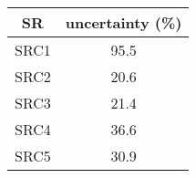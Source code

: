 \begin{tabular}{c||c} \hline\hline
{\bf SR} & {\bf uncertainty (\%)} \\ \hline
SRC1   & 95.5\\ \hline
SRC2   & 20.6\\ \hline
SRC3   & 21.4\\ \hline
SRC4   & 36.6\\ \hline
SRC5   & 30.9\\ \hline
\hline
\end{tabular}

